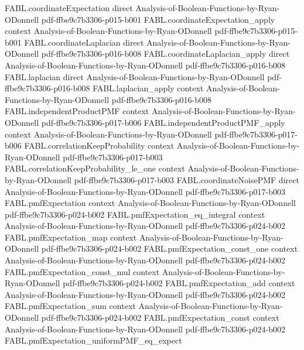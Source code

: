 \begin{theorem}
  {FABL.coordinateExpectation}
  {direct}
  {Analysis-of-Boolean-Functions-by-Ryan-ODonnell}
  {pdf-ffbe9c7b3306-p015-b001}
\proofstep
  {FABL.coordinateExpectation_apply}
  {context}
  {Analysis-of-Boolean-Functions-by-Ryan-ODonnell}
  {pdf-ffbe9c7b3306-p015-b001}
\proofstep
  {FABL.coordinateLaplacian}
  {direct}
  {Analysis-of-Boolean-Functions-by-Ryan-ODonnell}
  {pdf-ffbe9c7b3306-p016-b008}
\proofstep
  {FABL.coordinateLaplacian_apply}
  {direct}
  {Analysis-of-Boolean-Functions-by-Ryan-ODonnell}
  {pdf-ffbe9c7b3306-p016-b008}
\proofstep
  {FABL.laplacian}
  {direct}
  {Analysis-of-Boolean-Functions-by-Ryan-ODonnell}
  {pdf-ffbe9c7b3306-p016-b008}
\proofstep
  {FABL.laplacian_apply}
  {context}
  {Analysis-of-Boolean-Functions-by-Ryan-ODonnell}
  {pdf-ffbe9c7b3306-p016-b008}
\proofstep
  {FABL.independentProductPMF}
  {context}
  {Analysis-of-Boolean-Functions-by-Ryan-ODonnell}
  {pdf-ffbe9c7b3306-p017-b006}
\proofstep
  {FABL.independentProductPMF_apply}
  {context}
  {Analysis-of-Boolean-Functions-by-Ryan-ODonnell}
  {pdf-ffbe9c7b3306-p017-b006}
\proofstep
  {FABL.correlationKeepProbability}
  {context}
  {Analysis-of-Boolean-Functions-by-Ryan-ODonnell}
  {pdf-ffbe9c7b3306-p017-b003}
\proofstep
  {FABL.correlationKeepProbability_le_one}
  {context}
  {Analysis-of-Boolean-Functions-by-Ryan-ODonnell}
  {pdf-ffbe9c7b3306-p017-b003}
\proofstep
  {FABL.coordinateNoisePMF}
  {direct}
  {Analysis-of-Boolean-Functions-by-Ryan-ODonnell}
  {pdf-ffbe9c7b3306-p017-b003}
\proofstep
  {FABL.pmfExpectation}
  {context}
  {Analysis-of-Boolean-Functions-by-Ryan-ODonnell}
  {pdf-ffbe9c7b3306-p024-b002}
\proofstep
  {FABL.pmfExpectation_eq_integral}
  {context}
  {Analysis-of-Boolean-Functions-by-Ryan-ODonnell}
  {pdf-ffbe9c7b3306-p024-b002}
\proofstep
  {FABL.pmfExpectation_map}
  {context}
  {Analysis-of-Boolean-Functions-by-Ryan-ODonnell}
  {pdf-ffbe9c7b3306-p024-b002}
\proofstep
  {FABL.pmfExpectation_const_one}
  {context}
  {Analysis-of-Boolean-Functions-by-Ryan-ODonnell}
  {pdf-ffbe9c7b3306-p024-b002}
\proofstep
  {FABL.pmfExpectation_const_mul}
  {context}
  {Analysis-of-Boolean-Functions-by-Ryan-ODonnell}
  {pdf-ffbe9c7b3306-p024-b002}
\proofstep
  {FABL.pmfExpectation_add}
  {context}
  {Analysis-of-Boolean-Functions-by-Ryan-ODonnell}
  {pdf-ffbe9c7b3306-p024-b002}
\proofstep
  {FABL.pmfExpectation_sum}
  {context}
  {Analysis-of-Boolean-Functions-by-Ryan-ODonnell}
  {pdf-ffbe9c7b3306-p024-b002}
\proofstep
  {FABL.pmfExpectation_const}
  {context}
  {Analysis-of-Boolean-Functions-by-Ryan-ODonnell}
  {pdf-ffbe9c7b3306-p024-b002}
\proofstep
  {FABL.pmfExpectation_uniformPMF_eq_expect}

\end{theorem}
